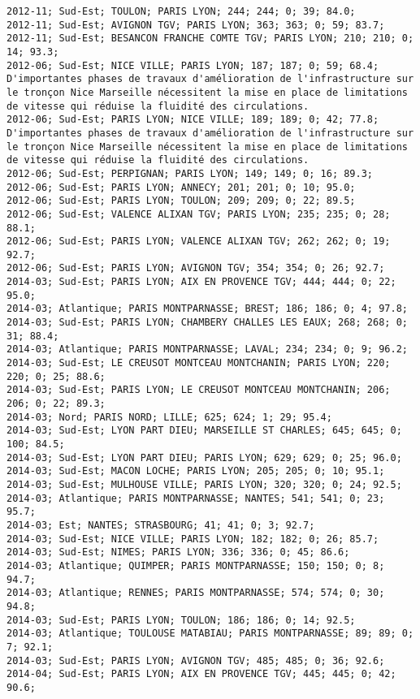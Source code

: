 \documentclass{article}
\begin{document}
\begin{Verbatim}[commandchars=\\\{\}]
2012-11; Sud-Est; TOULON; PARIS LYON; 244; 244; 0; 39; 84.0; 
2012-11; Sud-Est; AVIGNON TGV; PARIS LYON; 363; 363; 0; 59; 83.7; 
2012-11; Sud-Est; BESANCON FRANCHE COMTE TGV; PARIS LYON; 210; 210; 0; 14; 93.3; 
2012-06; Sud-Est; NICE VILLE; PARIS LYON; 187; 187; 0; 59; 68.4; D'importantes phases de travaux d'amélioration de l'infrastructure sur le tronçon Nice Marseille nécessitent la mise en place de limitations de vitesse qui réduise la fluidité des circulations.
2012-06; Sud-Est; PARIS LYON; NICE VILLE; 189; 189; 0; 42; 77.8; D'importantes phases de travaux d'amélioration de l'infrastructure sur le tronçon Nice Marseille nécessitent la mise en place de limitations de vitesse qui réduise la fluidité des circulations.
2012-06; Sud-Est; PERPIGNAN; PARIS LYON; 149; 149; 0; 16; 89.3; 
2012-06; Sud-Est; PARIS LYON; ANNECY; 201; 201; 0; 10; 95.0; 
2012-06; Sud-Est; PARIS LYON; TOULON; 209; 209; 0; 22; 89.5; 
2012-06; Sud-Est; VALENCE ALIXAN TGV; PARIS LYON; 235; 235; 0; 28; 88.1; 
2012-06; Sud-Est; PARIS LYON; VALENCE ALIXAN TGV; 262; 262; 0; 19; 92.7; 
2012-06; Sud-Est; PARIS LYON; AVIGNON TGV; 354; 354; 0; 26; 92.7; 
2014-03; Sud-Est; PARIS LYON; AIX EN PROVENCE TGV; 444; 444; 0; 22; 95.0; 
2014-03; Atlantique; PARIS MONTPARNASSE; BREST; 186; 186; 0; 4; 97.8; 
2014-03; Sud-Est; PARIS LYON; CHAMBERY CHALLES LES EAUX; 268; 268; 0; 31; 88.4; 
2014-03; Atlantique; PARIS MONTPARNASSE; LAVAL; 234; 234; 0; 9; 96.2; 
2014-03; Sud-Est; LE CREUSOT MONTCEAU MONTCHANIN; PARIS LYON; 220; 220; 0; 25; 88.6; 
2014-03; Sud-Est; PARIS LYON; LE CREUSOT MONTCEAU MONTCHANIN; 206; 206; 0; 22; 89.3; 
2014-03; Nord; PARIS NORD; LILLE; 625; 624; 1; 29; 95.4; 
2014-03; Sud-Est; LYON PART DIEU; MARSEILLE ST CHARLES; 645; 645; 0; 100; 84.5; 
2014-03; Sud-Est; LYON PART DIEU; PARIS LYON; 629; 629; 0; 25; 96.0; 
2014-03; Sud-Est; MACON LOCHE; PARIS LYON; 205; 205; 0; 10; 95.1; 
2014-03; Sud-Est; MULHOUSE VILLE; PARIS LYON; 320; 320; 0; 24; 92.5; 
2014-03; Atlantique; PARIS MONTPARNASSE; NANTES; 541; 541; 0; 23; 95.7; 
2014-03; Est; NANTES; STRASBOURG; 41; 41; 0; 3; 92.7; 
2014-03; Sud-Est; NICE VILLE; PARIS LYON; 182; 182; 0; 26; 85.7; 
2014-03; Sud-Est; NIMES; PARIS LYON; 336; 336; 0; 45; 86.6; 
2014-03; Atlantique; QUIMPER; PARIS MONTPARNASSE; 150; 150; 0; 8; 94.7; 
2014-03; Atlantique; RENNES; PARIS MONTPARNASSE; 574; 574; 0; 30; 94.8; 
2014-03; Sud-Est; PARIS LYON; TOULON; 186; 186; 0; 14; 92.5; 
2014-03; Atlantique; TOULOUSE MATABIAU; PARIS MONTPARNASSE; 89; 89; 0; 7; 92.1; 
2014-03; Sud-Est; PARIS LYON; AVIGNON TGV; 485; 485; 0; 36; 92.6; 
2014-04; Sud-Est; PARIS LYON; AIX EN PROVENCE TGV; 445; 445; 0; 42; 90.6; 

\end{Verbatim}
\end{document}
